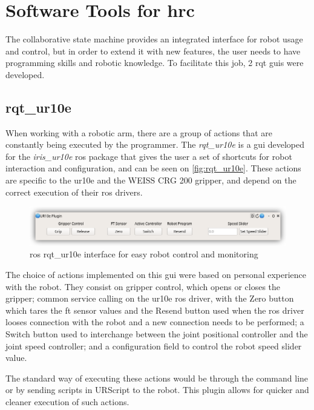 \section{Software Tools for \ac{hrc}}
\label{sec:tools-hrc}

\par The collaborative state machine provides an integrated interface for robot usage and control, but in order to extend it with new features, the user needs to have programming skills and robotic knowledge. To facilitate this job, 2 rqt \acp{gui} were developed.

\subsection{rqt\_ur10e}

\par When working with a robotic arm, there are a group of actions that are constantly being executed by the programmer. The \textit{rqt\_ur10e} is a \ac{gui} developed for the \textit{iris\_ur10e} \ac{ros} package that gives the user a set of shortcuts for robot interaction and configuration, and can be seen on \autoref{fig:rqt_ur10e}. These actions are specific to the \ac{ur10e} and the WEISS CRG 200 gripper, and depend on the correct execution of their \ac{ros} drivers.

\begin{figure}[h]
    \centering
    \includegraphics[width=0.9\linewidth]{figs/chp5/rqt_ur10e.png}
    \caption{\ac{ros} rqt\_ur10e interface for easy robot control and monitoring}
    \label{fig:rqt_ur10e}
\end{figure}

\par The choice of actions implemented on this \ac{gui} were based on personal experience with the robot. They consist on gripper control, which opens or closes the gripper; common service calling on the \ac{ur10e} \ac{ros} driver, with the Zero button which tares the \ac{ft} sensor values and the Resend button used when the \ac{ros} driver looses connection with the robot and a new connection needs to be performed; a Switch button used to interchange between the joint positional controller and the joint speed controller; and a configuration field to control the robot speed slider value. 
\par The standard way of executing these actions would be through the command line or by sending scripts in URScript to the robot. This plugin allows for quicker and cleaner execution of such actions.



